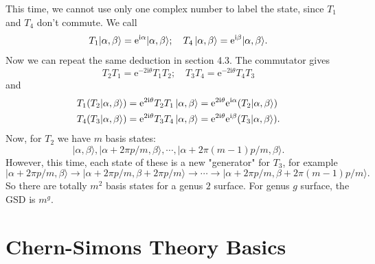 \documentclass{book}
\begin{document}
This time, we cannot use only one complex number to label the state, since $T_{1}$ and $T_{4}$ don't commute. We call
\begin{equation*}
T_{1} |\alpha ,\beta \rangle =\mathrm{e}^{\mathrm{i} \alpha } |\alpha ,\beta \rangle ;\quad T_{4}\ket{\alpha ,\beta } =\mathrm{e}^{\mathrm{i} \beta } |\alpha ,\beta \rangle .
\end{equation*}
Now we can repeat the same deduction in section 4.3. The commutator gives
\begin{equation*}
T_{2} T_{1} =\mathrm{e}^{-2\mathrm{i} \theta } T_{1} T_{2} ;\quad T_{3} T_{4} =\mathrm{e}^{-2\mathrm{i} \theta } T_{4} T_{3}
\end{equation*}
and
\begin{equation*}
\begin{aligned}
T_{1}( T_{2} |\alpha ,\beta \rangle ) & =\mathrm{e}^{2\mathrm{i} \theta } T_{2} T_{1}\ket{\alpha ,\beta } =\mathrm{e}^{2\mathrm{i} \theta }\mathrm{e}^{\mathrm{i} \alpha }( T_{2} |\alpha ,\beta \rangle )\\
T_{4}( T_{3} |\alpha ,\beta \rangle ) & =\mathrm{e}^{2\mathrm{i} \theta } T_{3} T_{4}\ket{\alpha ,\beta } =\mathrm{e}^{2\mathrm{i} \theta }\mathrm{e}^{\mathrm{i} \beta }( T_{3} |\alpha ,\beta \rangle ) .
\end{aligned}
\end{equation*}
Now, for $T_{2}$ we have $m$ basis states:
\begin{equation*}
|\alpha ,\beta \rangle ,|\alpha +2\pi p/m,\beta \rangle ,\cdots ,|\alpha +2\pi ( m-1) p/m,\beta \rangle .
\end{equation*}
However, this time, each state of these is a new "generator" for $T_{3}$, for example
\begin{equation*}
|\alpha +2\pi p/m,\beta \rangle \rightarrow |\alpha +2\pi p/m,\beta +2\pi p/m\rangle \rightarrow \cdots \rightarrow |\alpha +2\pi p/m,\beta +2\pi ( m-1) p/m\rangle .
\end{equation*}
So there are totally $m^{2}$ basis states for a genus $2$ surface. For genus $g$ surface, the GSD is $m^{g}$. 

\chapter{Chern-Simons Theory Basics}
\end{document}
